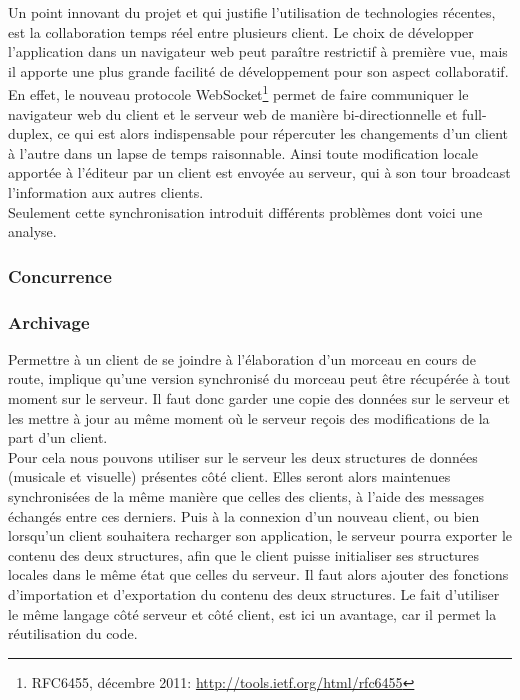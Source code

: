 \documentclass[12pt,a4paper]{article}
\begin{document}
Un point innovant du projet et qui justifie l’utilisation de technologies récentes, est la collaboration temps réel entre plusieurs client. Le choix de développer l’application dans un navigateur web peut paraître restrictif à première vue, mais il apporte une plus grande facilité de développement pour son aspect collaboratif.\\
En effet, le nouveau protocole WebSocket\footnote{RFC6455, décembre 2011: \url{http://tools.ietf.org/html/rfc6455}} permet de faire communiquer le navigateur web du client et le serveur web de manière bi-directionnelle et full-duplex, ce qui est alors indispensable pour répercuter les changements d’un client à l’autre dans un lapse de temps raisonnable. Ainsi toute modification locale apportée à l’éditeur par un client est envoyée au serveur, qui à son tour broadcast l’information aux autres clients.\\
Seulement cette synchronisation introduit différents problèmes dont voici une analyse.

\subsubsection{Concurrence}

\subsubsection{Archivage}

Permettre à un client de se joindre à l’élaboration d’un morceau en cours de route, implique qu’une version synchronisé du morceau peut être récupérée à tout moment sur le serveur. Il faut donc garder une copie des données sur le serveur et les mettre à jour au même moment où le serveur reçois des modifications de la part d’un client.\\
Pour cela nous pouvons utiliser sur le serveur les deux structures de données (musicale et visuelle) présentes côté client. Elles seront alors maintenues synchronisées de la même manière que celles des clients, à l’aide des messages échangés entre ces derniers. Puis à la connexion d’un nouveau client, ou bien lorsqu’un client souhaitera recharger son application, le serveur pourra exporter le contenu des deux structures, afin que le client puisse initialiser ses structures locales dans le même état que celles du serveur. Il faut alors ajouter des fonctions d’importation et d’exportation du contenu des deux structures. Le fait d’utiliser le même langage côté serveur et côté client, est ici un avantage, car il permet la réutilisation du code.
\end{document}
